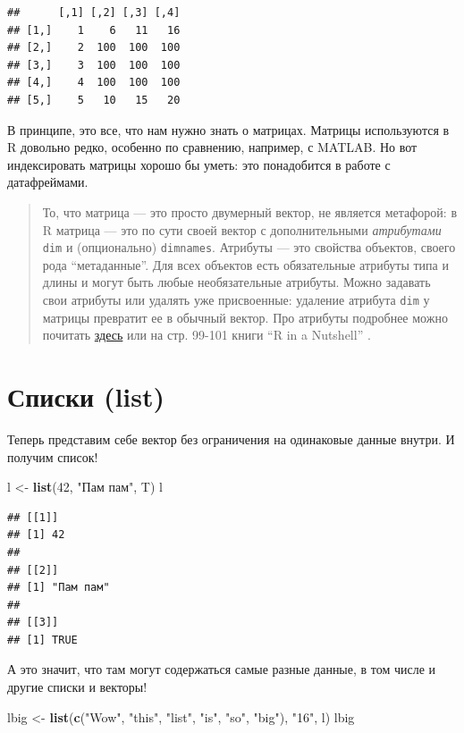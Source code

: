 \documentclass[]{book}
\newenvironment{Shaded}{\begin{snugshade}}{\end{snugshade}}
\newcommand{\KeywordTok}[1]{\textcolor[rgb]{0.13,0.29,0.53}{\textbf{#1}}}
\newcommand{\DecValTok}[1]{\textcolor[rgb]{0.00,0.00,0.81}{#1}}
\newcommand{\StringTok}[1]{\textcolor[rgb]{0.31,0.60,0.02}{#1}}
\newcommand{\NormalTok}[1]{#1}
\begin{document}
\begin{verbatim}
##      [,1] [,2] [,3] [,4]
## [1,]    1    6   11   16
## [2,]    2  100  100  100
## [3,]    3  100  100  100
## [4,]    4  100  100  100
## [5,]    5   10   15   20
\end{verbatim}

В принципе, это все, что нам нужно знать о матрицах. Матрицы
используются в R довольно редко, особенно по сравнению, например, с
MATLAB. Но вот индексировать матрицы хорошо бы уметь: это понадобится в
работе с датафреймами.

\begin{quote}
То, что матрица --- это просто двумерный вектор, не является метафорой:
в R матрица --- это по сути своей вектор с дополнительными
\emph{атрибутами} \texttt{dim} и (опционально) \texttt{dimnames}.
Атрибуты --- это свойства объектов, своего рода ``метаданные''. Для всех
объектов есть обязательные атрибуты типа и длины и могут быть любые
необязательные атрибуты. Можно задавать свои атрибуты или удалять уже
присвоенные: удаление атрибута \texttt{dim} у матрицы превратит ее в
обычный вектор. Про атрибуты подробнее можно почитать
\href{https://perso.esiee.fr/~courivad/R/06-objects.html}{здесь} или на
стр. 99-101 книги ``R in a Nutshell'' \citep{adler2010r}.
\end{quote}

\section{Списки (list)}\label{list}

Теперь представим себе вектор без ограничения на одинаковые данные
внутри. И получим список!

\begin{Shaded}
\begin{Highlighting}[]
\NormalTok{l <-}\StringTok{ }\KeywordTok{list}\NormalTok{(}\DecValTok{42}\NormalTok{, }\StringTok{"Пам пам"}\NormalTok{, T)}
\NormalTok{l}
\end{Highlighting}
\end{Shaded}

\begin{verbatim}
## [[1]]
## [1] 42
## 
## [[2]]
## [1] "Пам пам"
## 
## [[3]]
## [1] TRUE
\end{verbatim}

А это значит, что там могут содержаться самые разные данные, в том числе
и другие списки и векторы!

\begin{Shaded}
\begin{Highlighting}[]
\NormalTok{lbig <-}\StringTok{ }\KeywordTok{list}\NormalTok{(}\KeywordTok{c}\NormalTok{(}\StringTok{"Wow"}\NormalTok{, }\StringTok{"this"}\NormalTok{, }\StringTok{"list"}\NormalTok{, }\StringTok{"is"}\NormalTok{, }\StringTok{"so"}\NormalTok{, }\StringTok{"big"}\NormalTok{), }\StringTok{"16"}\NormalTok{, l)}
\NormalTok{lbig}
\end{Highlighting}
\end{Shaded}
\end{document}
